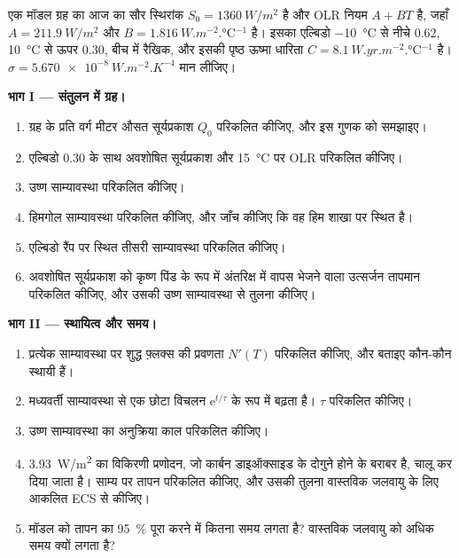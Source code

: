 \begin{problem}[{सप्ताहांत समस्या --- साम्यावस्थाएँ, स्थायित्व और
हिमाच्छादन देहली}]
\label{pb:b3:climate-models:1}
एक मॉडल ग्रह का आज का सौर स्थिरांक $S_0 = \qty{1360}{W/m^2}$ है और
OLR नियम $A + BT$ है, जहाँ $A = \qty{211.9}{W/m^2}$ और $B =
\qty{1.816}{W.m^{-2}.\celsius^{-1}}$ है। इसका एल्बिडो
\qty{-10}{\celsius} से नीचे 0.62, \qty{+10}{\celsius} से ऊपर 0.30, बीच में रैखिक, और
इसकी पृष्ठ ऊष्मा धारिता $C = \qty{8.1}{W.yr.m^{-2}.\celsius^{-1}}$ है।
$\sigma = \qty{5.670e-8}{W.m^{-2}.K^{-4}}$ मान लीजिए।

\medskip\noindent\textbf{भाग I --- संतुलन में ग्रह।}
\begin{enumerate}
\item ग्रह के प्रति वर्ग मीटर औसत सूर्यप्रकाश $Q_0$ परिकलित कीजिए, और
  इस गुणक को समझाइए।
\item एल्बिडो 0.30 के साथ अवशोषित सूर्यप्रकाश और
  \qty{15}{\celsius} पर OLR परिकलित कीजिए।
\item उष्ण साम्यावस्था परिकलित कीजिए।
\item हिमगोल साम्यावस्था परिकलित कीजिए, और जाँच कीजिए कि वह
  हिम शाखा पर स्थित है।
\item एल्बिडो रैंप पर स्थित तीसरी साम्यावस्था परिकलित कीजिए।
\item अवशोषित सूर्यप्रकाश को कृष्ण पिंड के रूप में अंतरिक्ष में
  वापस भेजने वाला उत्सर्जन तापमान परिकलित कीजिए, और उसकी उष्ण साम्यावस्था से तुलना कीजिए।
\end{enumerate}

\medskip\noindent\textbf{भाग II --- स्थायित्व और समय।}
\begin{enumerate}[resume]
\item प्रत्येक साम्यावस्था पर शुद्ध फ़्लक्स की प्रवणता $N'(T)$ परिकलित कीजिए, और बताइए
  कौन-कौन स्थायी हैं।
\item मध्यवर्ती साम्यावस्था से एक छोटा विचलन $\mathrm
  e^{t/\tau}$ के रूप में बढ़ता है। $\tau$ परिकलित कीजिए।
\item उष्ण साम्यावस्था का अनुक्रिया काल परिकलित कीजिए।
\item \qty{3.93}{W/m^2} का विकिरणी प्रणोदन, जो कार्बन डाइऑक्साइड के दोगुने
  होने के बराबर है, चालू कर दिया जाता है। साम्य पर तापन परिकलित कीजिए, और
  उसकी तुलना वास्तविक जलवायु के लिए आकलित ECS से कीजिए।
\item मॉडल को तापन का \qty{95}{\percent} पूरा करने में
  कितना समय लगता है? वास्तविक जलवायु को अधिक समय क्यों लगता है?
\end{enumerate}


\end{problem}
